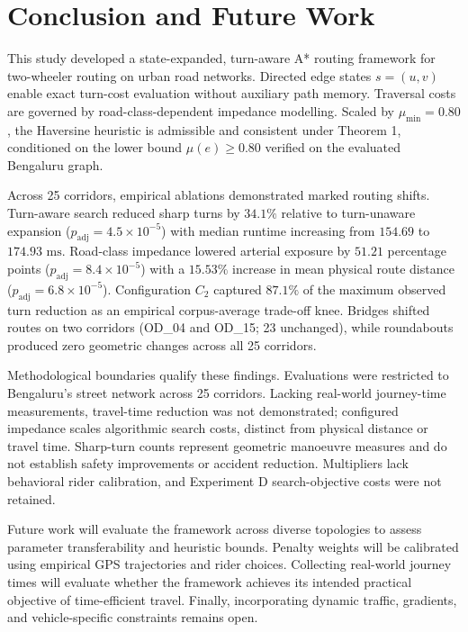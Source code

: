 \documentclass[conference]{IEEEtran}
\begin{document}
\section{Conclusion and Future Work}

This study developed a state-expanded, turn-aware A* routing framework for two-wheeler routing on urban road networks. Directed edge states $s = (u, v)$ enable exact turn-cost evaluation without auxiliary path memory. Traversal costs are governed by road-class-dependent impedance modelling. Scaled by $\mu_{\min} = 0.80$, the Haversine heuristic is admissible and consistent under Theorem 1, conditioned on the lower bound $\mu(e) \ge 0.80$ verified on the evaluated Bengaluru graph.

Across 25 corridors, empirical ablations demonstrated marked routing shifts. Turn-aware search reduced sharp turns by $34.1\%$ relative to turn-unaware expansion ($p_{\text{adj}} = 4.5 \times 10^{-5}$) with median runtime increasing from $154.69$ to $174.93\text{ ms}$. Road-class impedance lowered arterial exposure by $51.21$ percentage points ($p_{\text{adj}} = 8.4 \times 10^{-5}$) with a $15.53\%$ increase in mean physical route distance ($p_{\text{adj}} = 6.8 \times 10^{-5}$). Configuration $C_2$ captured $87.1\%$ of the maximum observed turn reduction as an empirical corpus-average trade-off knee. Bridges shifted routes on two corridors (OD\_04 and OD\_15; 23 unchanged), while roundabouts produced zero geometric changes across all 25 corridors.

Methodological boundaries qualify these findings. Evaluations were restricted to Bengaluru's street network across 25 corridors. Lacking real-world journey-time measurements, travel-time reduction was not demonstrated; configured impedance scales algorithmic search costs, distinct from physical distance or travel time. Sharp-turn counts represent geometric manoeuvre measures and do not establish safety improvements or accident reduction. Multipliers lack behavioral rider calibration, and Experiment D search-objective costs were not retained.

Future work will evaluate the framework across diverse topologies to assess parameter transferability and heuristic bounds. Penalty weights will be calibrated using empirical GPS trajectories and rider choices. Collecting real-world journey times will evaluate whether the framework achieves its intended practical objective of time-efficient travel. Finally, incorporating dynamic traffic, gradients, and vehicle-specific constraints remains open.



\end{document}
